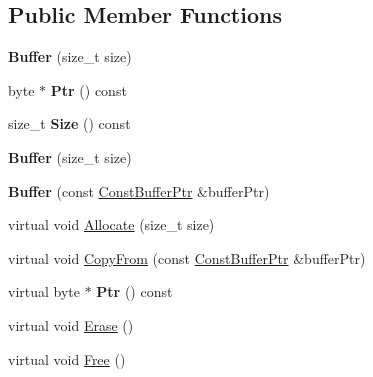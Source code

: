 \subsection*{Public Member Functions}
\begin{DoxyCompactItemize}
\item 
\mbox{\label{class_gost_crypt_1_1_buffer_a09ac1c3d1436782956d90f98265a3ae3}} 
{\bfseries Buffer} (size\+\_\+t size)
\item 
\mbox{\label{class_gost_crypt_1_1_buffer_ae0c06cf2c734eb311d920d96b8048045}} 
byte $\ast$ {\bfseries Ptr} () const
\item 
\mbox{\label{class_gost_crypt_1_1_buffer_a101e1d4b06456a624943c76b5532734a}} 
size\+\_\+t {\bfseries Size} () const
\item 
\mbox{\label{class_gost_crypt_1_1_buffer_a09ac1c3d1436782956d90f98265a3ae3}} 
{\bfseries Buffer} (size\+\_\+t size)
\item 
\mbox{\label{class_gost_crypt_1_1_buffer_a934195a431c9fee1d2235b5e81d8a5f3}} 
{\bfseries Buffer} (const \hyperlink{class_gost_crypt_1_1_const_buffer_ptr}{Const\+Buffer\+Ptr} \&buffer\+Ptr)
\item 
virtual void \hyperlink{class_gost_crypt_1_1_buffer_aa1416f36bf2d162cd6415989ca1a66d0}{Allocate} (size\+\_\+t size)
\item 
virtual void \hyperlink{class_gost_crypt_1_1_buffer_ab6437b9384e750a70b72b5d726f870dd}{Copy\+From} (const \hyperlink{class_gost_crypt_1_1_const_buffer_ptr}{Const\+Buffer\+Ptr} \&buffer\+Ptr)
\item 
\mbox{\label{class_gost_crypt_1_1_buffer_a9ca71006ad718cd5fcaef37239294730}} 
virtual byte $\ast$ {\bfseries Ptr} () const
\item 
virtual void \hyperlink{class_gost_crypt_1_1_buffer_ad9835ef686d5123d3ac022fceeaa9529}{Erase} ()
\item 
virtual void \hyperlink{class_gost_crypt_1_1_buffer_a80b126ff56504ad1d719dcad08c91e03}{Free} ()
\item 
\mbox{\label{class_gost_crypt_1_1_buffer_af004da2537b11680924a3f622ee1e757}} 

\end{DoxyCompactItemize}
